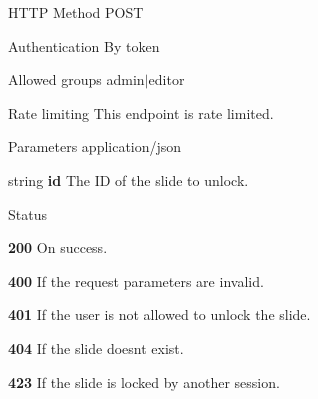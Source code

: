 \begin{DoxyParagraph}{H\+T\+TP Method}
P\+O\+ST 
\end{DoxyParagraph}
\begin{DoxyParagraph}{Authentication}
By token 
\end{DoxyParagraph}
\begin{DoxyParagraph}{Allowed groups}
{\ttfamily admin$\vert$editor} 
\end{DoxyParagraph}
\begin{DoxyParagraph}{Rate limiting}
This endpoint is rate limited.
\end{DoxyParagraph}
\begin{DoxyParagraph}{Parameters}
application/json
\begin{DoxyItemize}
\item {\ttfamily string} {\bfseries id} The ID of the slide to unlock.
\end{DoxyItemize}
\end{DoxyParagraph}
\begin{DoxyParagraph}{Status}

\begin{DoxyItemize}
\item {\bfseries 200} On success.
\item {\bfseries 400} If the request parameters are invalid.
\item {\bfseries 401} If the user is not allowed to unlock the slide.
\item {\bfseries 404} If the slide doesn\textquotesingle{}t exist.
\item {\bfseries 423} If the slide is locked by another session. 
\end{DoxyItemize}
\end{DoxyParagraph}
